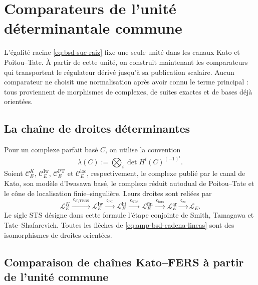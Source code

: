 
\section{Comparateurs de l'unité déterminantale commune}
\label{sec:amp-bsd-comparadores}

L'égalité racine \eqref{eq:bsd-suc-raiz} fixe une seule unité dans les canaux
Kato et Poitou--Tate. À partir de cette unité, on construit maintenant les
comparateurs qui transportent le régulateur dérivé jusqu'à sa publication
scalaire. Aucun comparateur ne choisit une normalisation après avoir connu le
terme principal : tous proviennent de morphismes de complexes, de suites
exactes et de bases déjà orientées.

\subsection{La chaîne de droites déterminantes}
\label{subsec:amp-bsd-lineas}

Pour un complexe parfait basé \(C\), on utilise la convention
\begin{equation}\label{eq:amp-bsd-linea-determinante}
 \lambda(C):=\bigotimes_i
 \det H^i(C)^{(-1)^i}.
\end{equation}
Soient \(\mathcal C_E^K\), \(\mathcal C_E^{\mathrm{Iw}}\),
\(\mathcal C_E^{\mathrm{PT}}\) et \(\mathcal C_E^{\mathrm{loc}}\),
respectivement, le complexe publié par le canal de Kato, son modèle
d'Iwasawa basé, le complexe réduit autodual de Poitou--Tate et le cône de
localisation finie--singulière. Leurs droites sont reliées par
\begin{equation}\label{eq:amp-bsd-cadena-lineas}
 \mathcal L_E^K
 \xrightarrow{\ \mathfrak c_{K/\mathrm{FERS}}\ }
 \mathcal L_E^{\mathrm{Iw}}
 \xrightarrow{\ \mathfrak c_{\mathrm{PT}}\ }
 \mathcal L_E^{\mathrm{ht}}
 \xrightarrow{\ \mathfrak c_{\mathrm{STS}}\ }
 \mathcal L_E^{\mathrm{fin}}
 \xrightarrow{\ \mathfrak c_{\mathrm{tors}}\ }
 \mathcal L_E^{\mathrm{ar}}
 \xrightarrow{\ \mathfrak c_{\infty}\ }
 \mathcal L_E.
\end{equation}
Le sigle \(\mathrm{STS}\) désigne dans cette formule l'étape conjointe de
Smith, Tamagawa et Tate--Shafarevich. Toutes les flèches de
\eqref{eq:amp-bsd-cadena-lineas} sont des isomorphismes de droites orientées.

\subsection{Comparaison de chaînes Kato--FERS à partir de l'unité commune}
\label{subsec:amp-bsd-comparacion-cadenas-kato-fers}

